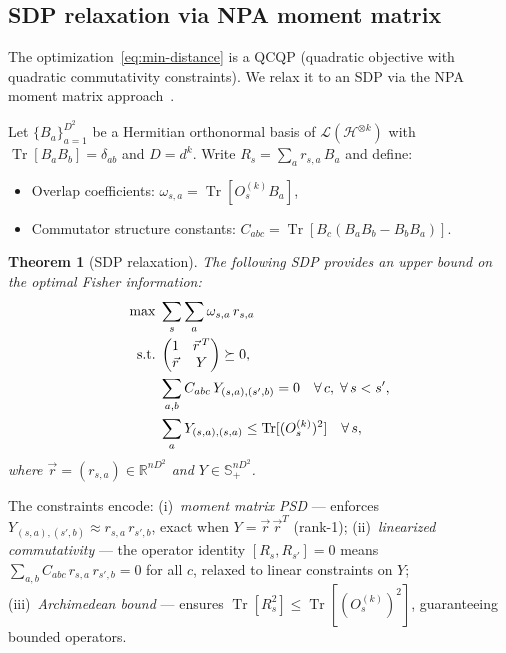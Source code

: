 \documentclass[aps,%
twocolumn,%
floatfix,%
pra,%
amsfonts,%
groupedaddress,%
superscriptaddress]{revtex4-2}%
\newtheorem{theorem}{Theorem}
\DeclareMathOperator{\tr}{Tr}
\newcommand{\ox}{\otimes}
\newcommand{\1}{\mathbbm{1}}
\newcommand*{\cH}{\mathcal{H}}
\newcommand*{\cL}{\mathcal{L}}
\begin{document}
\subsection{SDP relaxation via NPA moment matrix}\label{app:sdp_npa}

The optimization~\eqref{eq:min-distance} is a QCQP (quadratic objective with quadratic commutativity constraints). We relax it to an SDP via the NPA moment matrix approach~\cite{navascues2008convergent,pironio2010convergent}.

Let $\{B_a\}_{a=1}^{D^2}$ be a Hermitian orthonormal basis of $\cL(\cH^{\ox k})$ with $\tr[B_a B_b] = \delta_{ab}$ and $D = d^k$. Write $R_s = \sum_a r_{s,a}\,B_a$ and define:
\begin{itemize}
\item Overlap coefficients: $\omega_{s,a} = \tr[O_s^{(k)} B_a]$,
\item Commutator structure constants: $C_{abc} = \tr[B_c(B_aB_b - B_bB_a)]$.
\end{itemize}

\begin{theorem}[SDP relaxation]\label{thm:sdp-relaxation}
The following SDP provides an upper bound on the optimal Fisher information:
\begin{align}\label{eq:sdp-relax}
\max\; & \sum_s \sum_a \omega_{s,a}\, r_{s,a} \notag\\
\text{s.t.}\; & \begin{pmatrix} 1 & \vec{r}^{\,T} \\ \vec{r} & Y \end{pmatrix} \succeq 0, \notag\\
& \sum_{a,b} C_{abc}\, Y_{(s,a),(s',b)} = 0 \quad \forall\,c,\;\forall\,s < s', \notag\\
& \sum_a Y_{(s,a),(s,a)} \leq \tr[(O_s^{(k)})^2] \quad \forall\,s,
\end{align}
where $\vec{r} = (r_{s,a}) \in \mathbb{R}^{nD^2}$ and $Y \in \mathbb{S}_+^{nD^2}$.
\end{theorem}

The constraints encode: (i)~\emph{moment matrix PSD} --- enforces $Y_{(s,a),(s',b)} \approx r_{s,a}\,r_{s',b}$, exact when $Y = \vec{r}\,\vec{r}^T$ (rank-1); (ii)~\emph{linearized commutativity} --- the operator identity $[R_s, R_{s'}] = 0$ means $\sum_{a,b} C_{abc}\,r_{s,a}\,r_{s',b} = 0$ for all $c$, relaxed to linear constraints on $Y$; (iii)~\emph{Archimedean bound} --- ensures $\tr[R_s^2] \leq \tr[(O_s^{(k)})^2]$, guaranteeing bounded operators.
\end{document}
